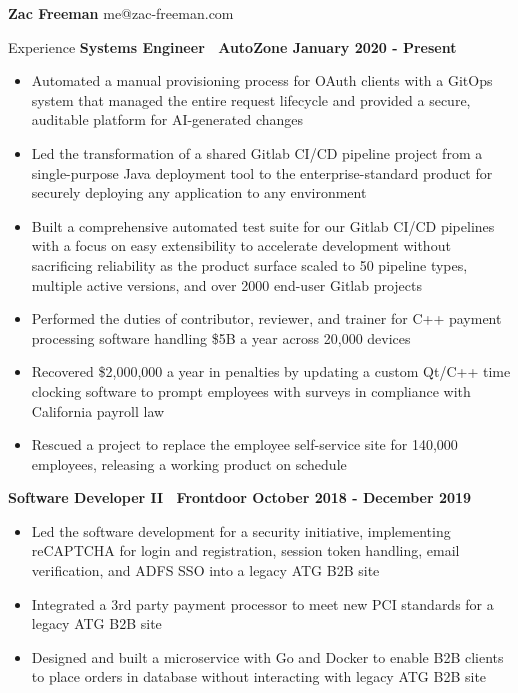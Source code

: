 \documentclass{resume} %
\newcommand{\normaltilde}{\raisebox{0.5ex}{\texttildelow}}
\begin{document}
\textbf{Zac Freeman} \hfill\newline
me@zac-freeman.com \hfill\newline

\begin{rSection}{Experience}
    {\bf Systems Engineer \textbar\ AutoZone \hfill January 2020 - Present}
    \begin{itemize}
        \item Automated a manual provisioning process for OAuth clients with a GitOps system that managed the entire request lifecycle and provided a secure, auditable platform for AI-generated changes
        \item Led the transformation of a shared Gitlab CI/CD pipeline project from a single-purpose Java deployment tool to the enterprise-standard product for securely deploying any application to any environment
        \item Built a comprehensive automated test suite for our Gitlab CI/CD pipelines with a focus on easy extensibility to accelerate development without sacrificing reliability as the product surface scaled to \normaltilde50 pipeline types, multiple active versions, and over 2000 end-user Gitlab projects
        \item Performed the duties of contributor, reviewer, and trainer for C++ payment processing software handling \$5B a year across 20,000 devices
        \item Recovered \$2,000,000 a year in penalties by updating a custom Qt/C++ time clocking software to prompt employees with surveys in compliance with California payroll law
        \item Rescued a project to replace the employee self-service site for 140,000 employees, releasing a working product on schedule
    \end{itemize}

    {\bf Software Developer II \textbar\ Frontdoor \hfill October 2018 - December 2019}
    \begin{itemize}
        \item Led the software development for a security initiative, implementing reCAPTCHA for login and registration, session token handling, email verification, and ADFS SSO into a legacy ATG B2B site
        \item Integrated a 3rd party payment processor to meet new PCI standards for a legacy ATG B2B site
        \item Designed and built a microservice with Go and Docker to enable B2B clients to place orders in database without interacting with legacy ATG B2B site
    \end{itemize}
    

\end{rSection}
\end{document}
